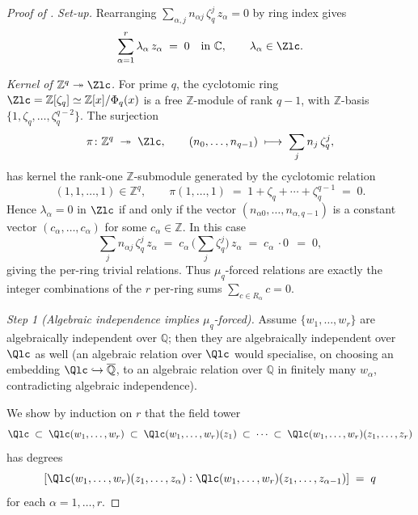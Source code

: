 \begin{proof}[Proof of ]
\textit{Set-up.}
Rearranging $\sum_{\alpha, j} n_{\alpha j}\, \zeta_q^j\, z_\alpha = 0$
by ring index gives
\begin{equation}\label{eq:D2-rearranged}
   \sum_{\alpha = 1}^{r} \lambda_\alpha\, z_\alpha \;=\; 0
   \quad \text{in } \mathbb{C},
   \qquad \lambda_\alpha \in \Zlc.
\end{equation}

\smallskip
\textit{Kernel of $\mathbb{Z}^q \twoheadrightarrow \Zlc$.}
For prime $q$, the cyclotomic ring $\Zlc = \mathbb{Z}[\zeta_q] \simeq
\mathbb{Z}[x] / \Phi_q(x)$ is a free $\mathbb{Z}$-module of rank
$q - 1$, with $\mathbb{Z}$-basis $\{1, \zeta_q, \dots, \zeta_q^{q-2}\}$.
The surjection
\[
   \pi \colon \mathbb{Z}^{q} \;\twoheadrightarrow\; \Zlc,
   \qquad
   (n_0, \dots, n_{q-1}) \;\longmapsto\; \sum_j n_j\, \zeta_q^j,
\]
has kernel the rank-one $\mathbb{Z}$-submodule generated by the
cyclotomic relation
\[
   (1, 1, \dots, 1) \in \mathbb{Z}^q,
   \qquad
   \pi(1, \dots, 1) \;=\; 1 + \zeta_q + \cdots + \zeta_q^{q-1}
   \;=\; 0.
\]
Hence $\lambda_\alpha = 0$ in $\Zlc$ if and only if the vector
$(n_{\alpha 0}, \dots, n_{\alpha, q-1})$ is a constant vector
$(c_\alpha, \dots, c_\alpha)$ for some $c_\alpha \in \mathbb{Z}$.
In this case
\[
   \sum_{j} n_{\alpha j}\, \zeta_q^j\, z_\alpha
   \;=\;
   c_\alpha\, \Big(\sum_j \zeta_q^j\Big)\, z_\alpha
   \;=\;
   c_\alpha\, \cdot 0\,
   \;=\; 0,
\]
giving the per-ring trivial relations. Thus $\mu_q$-forced relations
are exactly the integer combinations of the $r$ per-ring sums
$\sum_{c \in R_\alpha} c = 0$.

\smallskip
\textit{Step 1 (Algebraic independence implies $\mu_q$-forced).}
Assume $\{w_1, \dots, w_r\}$ are algebraically independent over
$\mathbb{Q}$; then they are algebraically independent over
$\Qlc$ as well (an algebraic relation over $\Qlc$ would specialise,
on choosing an embedding $\Qlc \hookrightarrow \overline{\mathbb{Q}}$,
to an algebraic relation over $\mathbb{Q}$ in finitely many
$w_\alpha$, contradicting algebraic independence).

We show by induction on $r$ that the field tower
\begin{equation}\label{eq:D2-tower}
   \Qlc \;\subset\; \Qlc(w_1, \dots, w_r)
   \;\subset\; \Qlc(w_1, \dots, w_r)(z_1)
   \;\subset\; \cdots
   \;\subset\; \Qlc(w_1, \dots, w_r)(z_1, \dots, z_r)
\end{equation}
has degrees
\[
   [\Qlc(w_1, \dots, w_r)(z_1, \dots, z_\alpha) :
   \Qlc(w_1, \dots, w_r)(z_1, \dots, z_{\alpha - 1})] \;=\; q
\]
for each $\alpha = 1, \dots, r$.


\end{proof}
